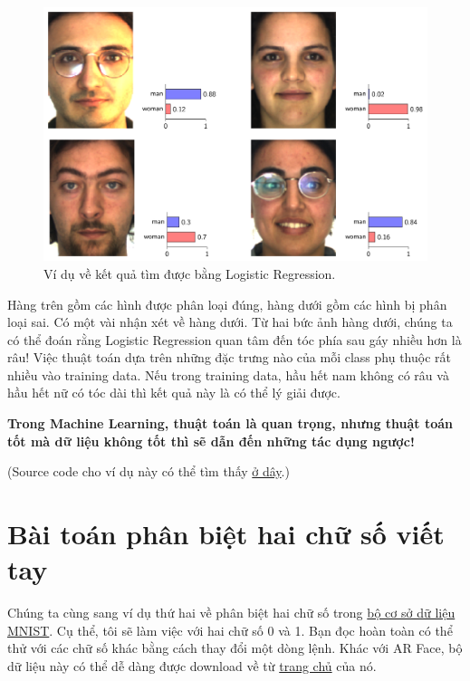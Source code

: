 \begin{figure}[t]
 \centering
     \includegraphics[width = \textwidth]{Chapters/05_NeuralNetworks/12_binaryclassifiers/ARgenderResult.png}
     \caption[]{Ví dụ về kết quả tìm được bằng Logistic Regression.}
     \label{fig:12_2}
 \end{figure} 
Hàng trên gồm các hình được phân loại đúng, hàng dưới gồm các hình bị phân loại sai. Có một vài nhận xét về hàng dưới. Từ hai bức ảnh hàng dưới, chúng ta có thể đoán rằng Logistic Regression quan tâm đến tóc phía sau gáy nhiều hơn là râu! Việc thuật toán dựa trên những đặc trưng nào của mỗi class phụ thuộc rất nhiều vào training data. Nếu trong training data, hầu hết nam không có râu và hầu hết nữ có tóc dài thì kết quả này là có thể lý giải được.  
 
\textbf{Trong Machine Learning, thuật toán là quan trọng, nhưng thuật toán tốt mà dữ liệu không tốt thì sẽ dẫn đến những tác dụng ngược!} 
 
(Source code cho ví dụ này có thể tìm thấy \href{https://github.com/tiepvupsu/tiepvupsu.github.io/blob/master/assets/LogReg2/ARGender.ipynb}{ở dây}.) 
 
\section{Bài toán phân biệt hai chữ số viết tay }
Chúng ta cùng sang ví dụ thứ hai về phân biệt hai chữ số trong \href{http://machinelearningcoban.com/2017/01/04/kmeans2/#bo-co-so-du-lieu-mnist}{bộ cơ sở dữ liệu MNIST}. Cụ thể, tôi sẽ làm việc với hai chữ số 0 và 1. Bạn đọc hoàn toàn có thể thử với các chữ số khác bằng cách thay đổi một dòng lệnh. Khác với AR Face, bộ dữ liệu này có thể dễ dàng được download về từ \href{http://yann.lecun.com/exdb/mnist/}{trang chủ} của nó. 
 
